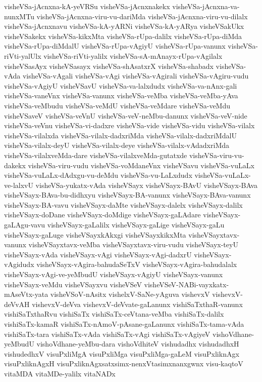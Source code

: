{visheVSa-jAcnxna-kA-yeVRSu
visheVSa-jAcnxnakekx
visheVSa-jAcnxna-va-nunxMTu
visheVSa-jAcnxna-viru-vu-dariMda
visheVSa-jAcnxna-viru-vu-dilalx
visheVSa-jAcnxnavu
visheVSa-kA-yARNi
visheVSa-kA-yARya
visheVSakUkx
visheVSakekx
visheVSa-kikxMta
visheVSa-rUpa-dalilx
visheVSa-rUpa-diMda
visheVSa-rUpa-diMdalU
visheVSa-rUpa-vAgiyU
visheVSa-rUpa-vanunx
visheVSa-riVti-yalUlx
visheVSa-riVti-yalilx
visheVSa-sA-mAnayx-rUpa-vAgilalx
visheVSasAyx
visheVSasayx
visheVSa-shAsatxrX
visheVSa-shabadx
visheVSa-vAda
visheVSa-vAgali
visheVSa-vAgi
visheVSa-vAgirali
visheVSa-vAgiru-vudu
visheVSa-vAgiyU
visheVSavU
visheVSa-va-lalxdudx
visheVSa-va-nAnx-gali
visheVSa-vaneVnx
visheVSa-vanunx
visheVSa-veMba
visheVSa-veMba-yAva
visheVSa-veMbudu
visheVSa-veMdU
visheVSa-veMdare
visheVSa-veMdu
visheVSaveV
visheVSa-veVnU
visheVSa-veV-neMbu-danunx
visheVSa-veV-nide
visheVSa-veVnu
visheVSa-vi-dadxre
visheVSa-vide
visheVSa-vidu
visheVSa-vilalx
visheVSa-vilalxda
visheVSa-vilalx-dadxriMda
visheVSa-vilalx-dadxriMdalU
visheVSa-vilalx-deyU
visheVSa-vilalx-deye
visheVSa-vilalx-vAdadxriMda
visheVSa-vilalxveMda-dare
visheVSa-vilalxveMda-gutatxde
visheVSa-viru-vu-dakekx
visheVSa-viru-vudu
visheVSa-voMdaneVnx
visheVSavu
visheVSa-vuLaLx
visheVSa-vuLaLx-dAdxgu-vu-deMdu
visheVSa-vu-LaLxdudx
visheVSa-vuLaLx-ve-lalxvU
visheVSa-yukatx-vAda
visheVSayx
visheVSayx-BAvU
visheVSayx-BAva
visheVSayx-BAva-bu-didhxyu
visheVSayx-BA-vanunx
visheVSayx-BAva-vanunx
visheVSayx-BA-vavu
visheVSayx-daMte
visheVSayx-dalelx
visheVSayx-dalilx
visheVSayx-doDane
visheVSayx-doMdige
visheVSayx-gaLAdare
visheVSayx-gaLAgu-vavu
visheVSayx-gaLalilx
visheVSayx-gaLige
visheVSayx-gaLu
visheVSayx-gaLuge
visheVSayxkAkxgi
visheVSayxkikxMta
visheVSayxtavx-vanunx
visheVSayxtavx-veMba
visheVSayxtavx-viru-vudu
visheVSayx-teyU
visheVSayx-vAda
visheVSayx-vAgi
visheVSayx-vAgi-dadxrU
visheVSayx-vAgidudx
visheVSayx-vAgira-bahudaSeTxV
visheVSayx-vAgira-bahudalalx
visheVSayx-vAgi-ve-yeMbudU
visheVSayx-vAgiyU
visheVSayx-vanunx
visheVSayx-veMdu
visheVSayxvu
visheVSeV
visheVSeV-NABi-vayxkatx-mAseVtx-yata
visheVSoV-nAsitx
vishelxV-SaNe-yAguva
vishevxV
vishevxV-deVvAH
vishevxV-deVva
vishevxV-deVvate-gaLanunx
vishiSaTxthaR-vanunx
vishiSaTxthaRvu
vishiSaTx
vishiSaTx-ceVtana-veMba
vishiSaTx-dalilx
vishiSaTx-kamaR
vishiSaTx-nAmoV-pAsane-gaLanunx
vishiSaTx-tama-vAda
vishiSaTx-tara
vishiSaTx-vAda
vishiSaTx-vAgi
vishiSaTx-vAgiyeV
vishoVdhane-yeMbudU
vishoVdhane-yeMbu-dara
vishoVdhiteV
vishudadhx
vishudadhxH
vishudedhxV
visuPxliMgA
visuPxliMga
visuPxliMga-gaLeM
visuPxliknAgx
visuPxliknAgxH
visuPxliknAgxsatxsimx-nenxVtasimxnanxgwnx
visu-kaqtoV
vitaMDA
vitaMDe-yalilx
vitaNADx
}
